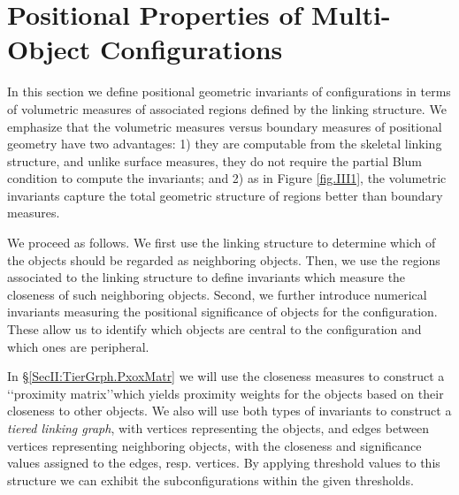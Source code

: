 \documentclass[10pt]{amsart}
\theoremstyle{definition}
\theoremstyle{definition}
\numberwithin{equation}{section}
\begin{document}
\section{Positional Properties of Multi-Object Configurations}
\label{SecII:PosGeom}
\par 
In this section we define positional geometric invariants of 
configurations in terms of volumetric measures of associated regions 
defined by the linking structure.  We emphasize that the volumetric 
measures versus boundary measures of positional geometry have two 
advantages: 1) they are computable from the skeletal linking structure, 
and unlike surface measures, they do not require the partial Blum 
condition to compute the invariants; and 2) as in Figure \ref{fig.III1}, the 
volumetric invariants capture the total geometric structure of regions 
better than boundary measures.  \par   
We proceed as follows.  We first use the linking structure to determine 
which of the objects should be regarded as neighboring objects.  Then, we 
use the regions associated to the linking structure to define invariants 
which measure the closeness of such neighboring objects.  Second, we 
further introduce numerical invariants measuring the positional 
significance of objects for the configuration.  These allow us to identify 
which objects are central to the configuration and which ones are 
peripheral.  \par 
In \S \ref{SecII:TierGrph.PxoxMatr} we will use the closeness measures to 
construct a \lq\lq proximity matrix\rq\rq which yields proximity weights 
for the objects based on their closeness to other objects.  We also will 
use both types of invariants to construct a {\it tiered linking graph}, with 
vertices representing the objects, and edges between vertices 
representing neighboring objects, with the closeness and significance 
values assigned to the edges, resp. vertices.  By applying threshold values 
to this structure we can exhibit the subconfigurations within the given 
thresholds.  
\par
\end{document}
